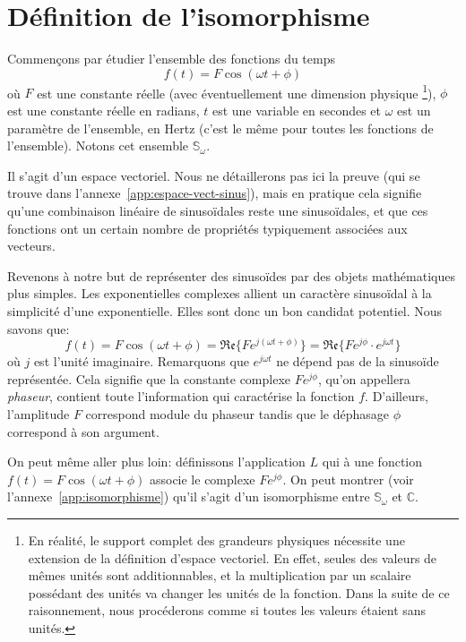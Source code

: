 \section{Définition de l'isomorphisme}
Commençons par étudier l'ensemble des fonctions du temps
\[
    f(t) = F\cos(\omega t + \phi)
\]
où $F$ est une constante réelle (avec éventuellement une dimension physique
\footnote{
    En réalité, le support complet des grandeurs physiques
    nécessite une extension de la définition d'espace vectoriel.
    En effet, seules des valeurs de mêmes unités sont additionnables,
    et la multiplication par un scalaire possédant des unités
    va changer les unités de la fonction.
    Dans la suite de ce raisonnement,
    nous procéderons comme si toutes les valeurs étaient sans unités.
}),
$\phi$ est une constante réelle en radians,
$t$ est une variable en secondes
et $\omega$ est un paramètre de l'ensemble, en Hertz
(c'est le même pour toutes les fonctions de l'ensemble).
Notons cet ensemble $\mathbb{S}_\omega$.

Il s'agit d'un espace vectoriel.
Nous ne détaillerons pas ici la preuve
(qui se trouve dans l'annexe~\ref{app:espace-vect-sinus}),
mais en pratique cela signifie qu'une combinaison linéaire
de sinusoïdales reste une sinusoïdales,
et que ces fonctions ont un certain nombre de propriétés
typiquement associées aux vecteurs.

Revenons à notre but de représenter des sinusoïdes
par des objets mathématiques plus simples.
Les exponentielles complexes allient un caractère sinusoïdal à
la simplicité d'une exponentielle.
Elles sont donc un bon candidat potentiel.
Nous savons que:
\begin{equation}
    f(t) = F\cos(\omega t + \phi) = \mathfrak{Re}\{Fe^{j(\omega t + \phi)}\}
    = \mathfrak{Re}\{Fe^{j\phi}\cdot e^{j\omega t}\}
\end{equation}
où $j$ est l'unité imaginaire.
Remarquons que $e^{j\omega t}$ ne dépend pas de la sinusoïde représentée.
Cela signifie que la constante complexe $Fe^{j\phi}$,
qu'on appellera \emph{phaseur}, contient
toute l'information qui caractérise la fonction $f$.
D'ailleurs, l'amplitude $F$ correspond module du phaseur
tandis que le déphasage $\phi$ correspond à son argument.

On peut même aller plus loin: définissons l'application $L$
qui à une fonction $f(t) = F\cos(\omega t + \phi)$
associe le complexe $Fe^{j\phi}$.
On peut montrer (voir l'annexe~\ref{app:isomorphisme}) qu'il s'agit d'un
isomorphisme entre $\mathbb{S}_\omega$ et $\mathbb{C}$.

